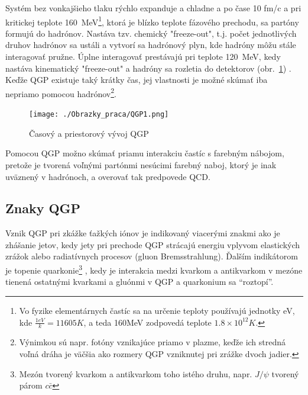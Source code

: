 \documentclass[thesismargins, thesislinespacing]{rnthesis}
\begin{document}
Systém bez vonkajšieho tlaku rýchlo expanduje a chladne a po čase 10 fm/c a pri kritickej teplote 160~MeV\footnote{Vo fyzike elementárnych častíc sa na určenie teploty používajú jednotky eV, kde $\frac{1eV}{k}= 11605K$, a teda 160MeV zodpovedá teplote $1.8\times10^{12}K$.}, ktorá je blízko teplote fázového prechodu, sa partóny formujú do hadrónov. Nastáva tzv. chemický "freeze-out\-", t.j. počet jednotlivých druhov hadrónov sa ustáli a vytvorí sa hadrónový plyn, kde hadróny môžu stále interagovať pružne. Úplne interagovať prestávajú pri teplote 120~MeV, kedy nastáva kinematický "freeze-out" \-a hadróny sa rozletia do detektorov (obr.~\ref{QGP}) . Keďže QGP existuje taký krátky čas, jej vlastnosti je možné skúmať iba nepriamo pomocou hadrónov\footnote{Výnimkou sú napr. fotóny vznikajúce priamo v plazme, keďže ich stredná voľná dráha je väčšia ako rozmery QGP vzniknutej pri zrážke dvoch jadier.}.  

\begin{figure}[hbtp!]
	\begin{center}
		\texttt{[image: ./Obrazky\_praca/QGP1.png]}
		\caption{ Časový a priestorový vývoj QGP \cite{vyvoj}}
		\label{QGP}
	\end{center}
\end{figure}  

Pomocou QGP možno skúmať priamu interakciu častíc s  farebným nábojom, pretože je tvorená voľnými partónmi nesúcimi farebný naboj, ktorý je inak uväznený v hadrónoch, a overovať tak predpovede QCD. 

\subsection{Znaky QGP} 

Vznik QGP pri zkážke ťažkých iónov je indikovaný viacerými znakmi ako je zhášanie jetov, kedy jety pri prechode QGP strácajú energiu vplyvom elastických zrážok alebo radiatívnych procesov (gluon Bremsstrahlung). Ďalším indikátorom je topenie quarkonie\footnote{Mezón tvorený kvarkom a antikvarkom toho istého druhu, napr. $J/ \psi$ tvorený párom $c \bar{c}$ } , kedy je interakcia medzi kvarkom a antikvarkom v mezóne tienená ostatnými kvarkami a gluónmi v QGP a quarkonium sa “roztopí”. 
\end{document}
